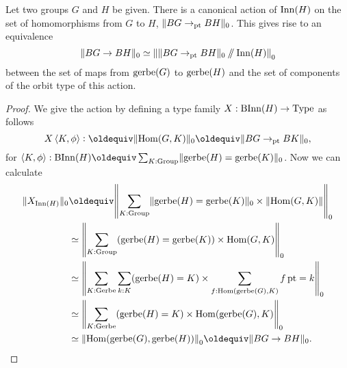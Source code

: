 \begin{theorem}
  Let two groups $G$ and $H$ be given.
  There is a canonical action of $\Inn(H)$
  on the set of homomorphisms from $G$ to $H$, $\Trunc{BG \to_\pt BH}_0$.
  This gives rise to an equivalence
  \[
    \Trunc{BG \to BH}_0 \equiv \Trunc*{\Trunc{BG \to_\pt BH}_0 \dblslash \Inn(H)}_0
  \]
  between the set of maps from $\gerbe(G)$ to $\gerbe(H)$ and the set of
  components of the orbit type of this action.
\end{theorem}
\begin{proof}
  We give the action by defining a type family $X : \B\Inn(H) \to \Type$ as follows
  \[
    X\, \angled{K,\phi} \defeq \Trunc{\Hom(G,K)}_0 \jdeq \Trunc{BG \to_\pt BK}_0,
  \]
  for $\angled{K,\phi} : \B\Inn(H) \jdeq \sum_{K : \Group} \Trunc{\gerbe(H) = \gerbe(K)}_0$.
  Now we can calculate
  \begin{align*}
    \Trunc{X_{\Inn(H)}}_0
    &\jdeq \Trunc*{\sum_{K:\Group}\Trunc{\gerbe(H)=\gerbe(K)}_0\times\Trunc{\Hom(G,K)}}_0 \\
    &\equiv \Trunc*{\sum_{K:\Group}(\gerbe(H)=\gerbe(K))\times\Hom(G,K)}_0 \\
    &\equiv \Trunc*{\sum_{K:\Gerbe}\sum_{k:K}(\gerbe(H)=K)\times\sum_{f:\Hom(\gerbe(G),K)}\mathop f \pt = k}_0 \\
    &\equiv \Trunc*{\sum_{K:\Gerbe} (\gerbe(H)=K) \times\Hom(\gerbe(G),K)}_0 \\
    &\equiv \Trunc*{\Hom(\gerbe(G),\gerbe(H))}_0 \jdeq \Trunc{BG \to BH}_0.\qedhere
  \end{align*}
\end{proof}

